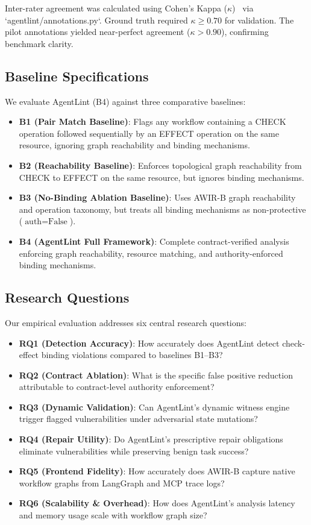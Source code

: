 Inter-rater agreement was calculated using Cohen's Kappa ($\kappa$)~\cite{cohen1960coefficient} via `agentlint/annotations.py`. Ground truth required $\kappa \ge 0.70$ for validation. The pilot annotations yielded near-perfect agreement ($\kappa > 0.90$), confirming benchmark clarity.

\subsection{Baseline Specifications}
We evaluate AgentLint (B4) against three comparative baselines:
\begin{itemize}
    \item \textbf{B1 (Pair Match Baseline)}: Flags any workflow containing a \textsf{CHECK} operation followed sequentially by an \textsf{EFFECT} operation on the same resource, ignoring graph reachability and binding mechanisms.
    \item \textbf{B2 (Reachability Baseline)}: Enforces topological graph reachability from \textsf{CHECK} to \textsf{EFFECT} on the same resource, but ignores binding mechanisms.
    \item \textbf{B3 (No-Binding Ablation Baseline)}: Uses \textsf{AWIR-B} graph reachability and operation taxonomy, but treats all binding mechanisms as non-protective ($\text{auth} = \text{False}$).
    \item \textbf{B4 (AgentLint Full Framework)}: Complete contract-verified analysis enforcing graph reachability, resource matching, and authority-enforced binding mechanisms.
\end{itemize}

\subsection{Research Questions}
Our empirical evaluation addresses six central research questions:
\begin{itemize}
    \item \textbf{RQ1 (Detection Accuracy)}: How accurately does AgentLint detect check-effect binding violations compared to baselines B1--B3?
    \item \textbf{RQ2 (Contract Ablation)}: What is the specific false positive reduction attributable to contract-level authority enforcement?
    \item \textbf{RQ3 (Dynamic Validation)}: Can AgentLint's dynamic witness engine trigger flagged vulnerabilities under adversarial state mutations?
    \item \textbf{RQ4 (Repair Utility)}: Do AgentLint's prescriptive repair obligations eliminate vulnerabilities while preserving benign task success?
    \item \textbf{RQ5 (Frontend Fidelity)}: How accurately does AWIR-B capture native workflow graphs from LangGraph and MCP trace logs?
    \item \textbf{RQ6 (Scalability \& Overhead)}: How does AgentLint's analysis latency and memory usage scale with workflow graph size?
\end{itemize}


